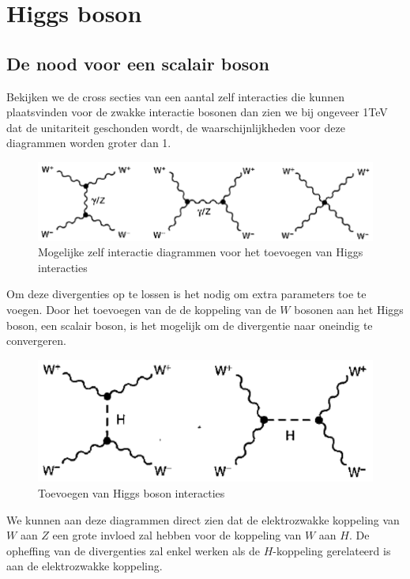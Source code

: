 \documentclass[../main.tex]{subfiles}
\begin{document}
\section{Higgs boson}%
\label{sec:higgs_boson}

\subsection{De nood voor een scalair boson}%
\label{sub:de_noot_voor_een_scalair_boson}

Bekijken we de cross secties van een aantal zelf interacties die kunnen plaatsvinden voor de zwakke interactie bosonen dan zien we bij ongeveer 1TeV dat de unitariteit geschonden wordt, de waarschijnlijkheden voor deze diagrammen worden groter dan 1.

\begin{figure}[h]
    \centering
    \includegraphics[width=0.8\linewidth]{higgs_boson/zwak_zelf_int_geen_H.png}
    \caption{Mogelijke zelf interactie diagrammen voor het toevoegen van Higgs interacties}%
    \label{fig:higgs_boson/zwak_zelf_int_geen_H}
\end{figure}

Om deze divergenties op te lossen is het nodig om extra parameters toe te voegen. Door het toevoegen van de de koppeling van de $W$ bosonen aan het Higgs boson, een scalair boson, is het mogelijk om de divergentie naar oneindig te convergeren.

\begin{figure}[h]
    \centering
    \includegraphics[width=0.6\linewidth]{higgs_boson/zwak_zelf_int_H.png}
    \caption{Toevoegen van Higgs boson interacties}%
    \label{fig:higgs_boson/zwak_zelf_int_H}
\end{figure}

We kunnen aan deze diagrammen direct zien dat de elektrozwakke koppeling van $W$ aan $Z$ een grote invloed zal hebben voor de koppeling van $W$ aan $H$. De opheffing van de divergenties zal enkel werken als de $H$-koppeling gerelateerd is aan de elektrozwakke koppeling.
\end{document}
